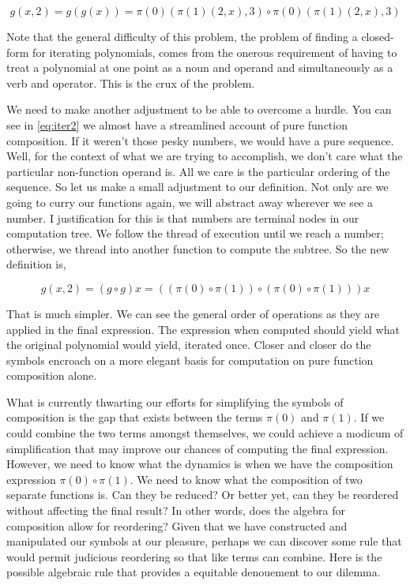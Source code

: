 \documentclass[12pt]{article}
\begin{document}
\begin{equation}
    g(x,2) = g(g(x)) = \pi(0)(\pi(1)(2,x), 3) \circ \pi(0)(\pi(1)(2,x), 3)
    \label{eq:iter2}
\end{equation}

Note that the general difficulty of this problem, the problem of finding a
closed-form for iterating polynomials, comes from the onerous requirement of
having to treat a polynomial at one point as a noun and operand and
simultaneously as a verb and operator. This is the crux of the problem.

We need to make another adjustment to be able to overcome a hurdle. You can see
in \ref{eq:iter2} we almost have a streamlined account of pure function
composition. If it weren't those pesky numbers, we would have a pure sequence.
Well, for the context of what we are trying to accomplish, we don't care what
the particular non-function operand is. All we care is the particular ordering
of the sequence. So let us make a small adjustment to our definition. Not only
are we going to curry our functions again, we will abstract away wherever we
see a number. I justification for this is that numbers are terminal nodes in
our computation tree. We follow the thread of execution until we reach a
number; otherwise, we thread into another function to compute the subtree. So
the new definition is,

\begin{equation}
    g(x,2) = (g \circ g) x = ((\pi(0) \circ \pi(1)) \circ (\pi(0) \circ \pi(1))) x
    \label{eq:iter3}
\end{equation}

That is much simpler. We can see the general order of operations as they are
applied in the final expression. The expression when computed should yield what
the original polynomial would yield, iterated once. Closer and closer do the
symbols encroach on a more elegant basis for computation on pure function
composition alone.

What is currently thwarting our efforts for simplifying the symbols of
composition is the gap that exists between the terms $\pi(0)$ and $\pi(1)$. If
we could combine the two terms amongst themselves, we could achieve a modicum
of simplification that may improve our chances of computing the final
expression. However, we need to know what the dynamics is when we have the
composition expression $\pi(0) \circ \pi(1)$. We need to know what the
composition of two separate functions is. Can they be reduced? Or better yet,
can they be reordered without affecting the final result? In other words, does
the algebra for composition allow for reordering? Given that we have
constructed and manipulated our symbols at our pleasure, perhaps we can
discover some rule that would permit judicious reordering so that like terms
can combine. Here is the possible algebraic rule that provides a equitable
denouement to our dilemma.
\end{document}
